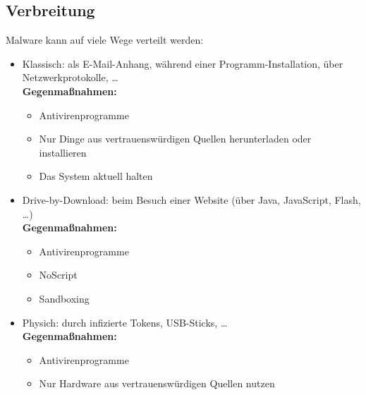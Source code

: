         \subsection{Verbreitung}
            Malware kann auf viele Wege verteilt werden:
            \begin{itemize}
            	\item Klassisch: als E-Mail-Anhang, während einer Programm-Installation, über Netzwerkprotokolle, \dots \\ \textbf{Gegenmaßnahmen:}
            	    \begin{itemize}
            	    	\item Antivirenprogramme
            	    	\item Nur Dinge aus vertrauenswürdigen Quellen herunterladen oder installieren
            	    	\item Das System aktuell halten
            	    \end{itemize}
                \item Drive-by-Download: beim Besuch einer Website (über Java, JavaScript, Flash, \dots) \\ \textbf{Gegenmaßnahmen:}
                    \begin{itemize}
                    	\item Antivirenprogramme
                    	\item NoScript
                    	\item Sandboxing
                    \end{itemize}
                \item Physich: durch infizierte Tokens, USB-Sticks, \dots \\ \textbf{Gegenmaßnahmen:}
                    \begin{itemize}
                    	\item Antivirenprogramme
                    	\item Nur Hardware aus vertrauenswürdigen Quellen nutzen
                    \end{itemize}
            \end{itemize}

